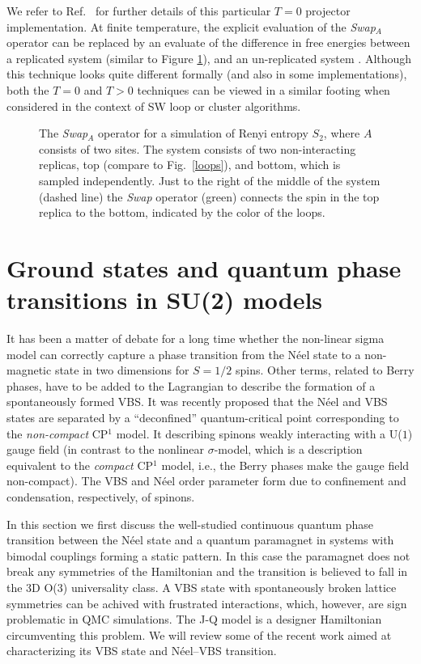 \documentclass[range]{ar2e}
\begin{document}
We refer to Ref.~\cite{Kallin11} for further details of this particular $T=0$ projector implementation.  At finite temperature, the explicit evaluation of the {\it Swap}$_A$ operator can be replaced by an evaluate of the difference in free energies between a replicated system (similar to Figure \ref{swap}), and an un-replicated system \cite{Melko10}.  Although this technique looks quite different formally (and also in some implementations), both the $T=0$ and $T>0$ techniques can be viewed in a similar footing when considered in the context of SW loop or cluster algorithms.


\begin{figure}
\centerline{}
\caption{The {\it Swap}$_A$ operator for a simulation of Renyi entropy $S_2$, where $A$ consists of two sites.  The system consists of two non-interacting replicas, top (compare to Fig.~\ref{loops}), and bottom, which is sampled independently.  Just to the right of the middle of the system (dashed line) the {\it Swap} operator (green) connects the spin in the top replica to the bottom, indicated by the color of the loops.  
}
\label{swap}
\end{figure}

\section{Ground states and quantum phase transitions in SU(2) models}
\label{sec:su2models}

It has been a matter of debate for a long time whether the non-linear sigma model can correctly capture a phase transition from the N\'eel state 
to a non-magnetic state in two dimensions for $S=1/2$ spins. Other terms, related to Berry phases, have to be added to the Lagrangian to describe the 
formation of a spontaneously formed VBS. It was recently proposed that the N\'eel and VBS states are separated by a ``deconfined'' quantum-critical 
point \cite{Senthil04a} corresponding to the {\it non-compact} CP$^1$ model. It  describing spinons weakly interacting with a U($1$) gauge field (in contrast 
to the nonlinear $\sigma$-model, which is a description equivalent to the {\it compact} CP$^1$ model, i.e., the Berry phases make the gauge field non-compact). 
The VBS and N\'eel order parameter form due to confinement and condensation, respectively, of spinons. 

In this section we first discuss the well-studied continuous quantum phase transition between the N\'eel state and a quantum paramagnet in systems 
with bimodal couplings forming a static pattern. In this case the paramagnet does not break any symmetries of the Hamiltonian and the transition 
is believed to fall in the 3D O($3$) universality class. A VBS state with spontaneously broken lattice symmetries can be achived with frustrated 
interactions, which, however, are sign problematic in QMC simulations. The J-Q model \cite{Sandvik07} is a designer Hamiltonian circumventing this 
problem. We will review some of the recent work aimed at characterizing its VBS state and  N\'eel--VBS transition.
\end{document}
